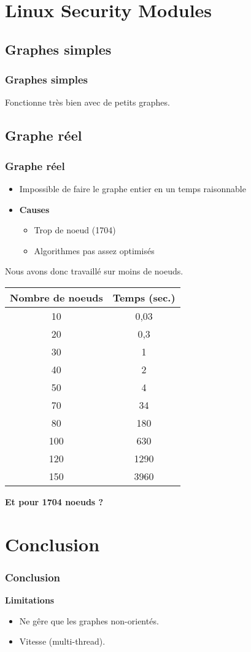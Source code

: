 \documentclass{beamer}
\begin{document}
\section{Linux Security Modules}
\subsection{Graphes simples}
\begin{frame}
\frametitle{Graphes simples}
Fonctionne très bien avec de petits graphes.\\

\end{frame}


\subsection{Graphe réel}
\begin{frame}
\frametitle{Graphe réel}
\begin{itemize}
	\item Impossible de faire le graphe entier en un temps raisonnable\\
	\item \textbf{Causes}
		\begin{itemize}
		\item Trop de noeud (1704)
		\item Algorithmes pas assez optimisés
		\end{itemize}
\end{itemize}
\end{frame}


\begin{frame}
Nous avons donc travaillé sur moins de noeuds.
\begin{center}
\begin{tabular}{|c|c|}
	\hline
	Nombre de noeuds & Temps (sec.) \\
	\hline
	10 & 0,03 \\
	\hline
	20 & 0,3\\
	\hline
	30 & 1\\
	\hline
	40 & 2\\
	\hline
	50 & 4\\
	\hline
	70 & 34\\
	\hline
	80 & 180\\
	\hline
	100 & 630\\
	\hline
	120 & 1290 \\
	\hline
	150 & 3960\\
	\hline
\end{tabular}
\end{center}
\textbf{Et pour 1704 noeuds ?}
\end{frame}

\section{Conclusion}
\begin{frame}
\frametitle{Conclusion}
\textbf{Limitations}
\begin{itemize}
\item Ne gêre que les graphes non-orientés.
\item Vitesse (multi-thread).
\end{itemize}

\end{frame}
\end{document}
